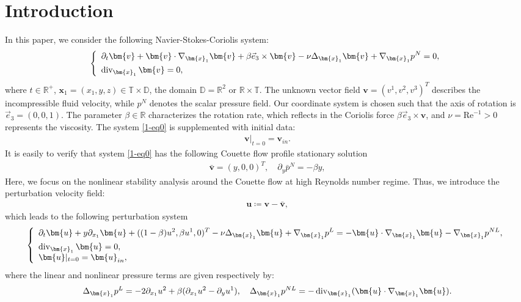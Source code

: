 \documentclass[11pt,reqno]{article}
\numberwithin{equation}{section}
\newcommand\R{{\mathbb R}}
\newcommand\T{{\mathbb T}}
\newcommand\DD{{\mathbb D}}
\newcommand\x{\bm{x}}
\newcommand\uu{\bm{u}}
\newcommand\vv{\bm{v}}
\newcommand \tri {\coloneqq}
\let\pa=\partial
\def\dive{\mathop{\rm div}\nolimits}
\newcommand{\Rey}{\mathrm{Re}}
\begin{document}
	\section{Introduction}
	
	In this paper, we consider the following Navier-Stokes-Coriolis system:
	\begin{align}\label{1-eq0}
		\left\{\begin{array}{l}
			\displaystyle
			\partial_{t}\vv + \vv\cdot \nabla_{\x_1} \vv+\beta \vec{e}_3 \times \vv-\nu \Delta_{\x_1}\vv+\nabla_{\x_1} p^N=0,
			\\[1ex]
			\displaystyle
			\dive_{\x_1} \vv=0,
		\end{array}\right.
	\end{align}
	where $t\in\R^+$, $\x_1=(x_1,y,z)\in \T\times\DD$, the domain $\DD=\R^2$ or $\R\times\T$.
	The unknown vector field $\vv=(v^1,v^2,v^3)^{T}$ describes the incompressible fluid velocity, while $p^N$ denotes the scalar pressure field.
	Our coordinate system is chosen such that the axis of rotation is  $\vec{e}_3=(0,0,1)$.
	The parameter $\beta\in\R$ characterizes the rotation rate, which reflects in the Coriolis force $\beta \vec{e}_3 \times \vv$, and $\nu=\Rey^{-1}>0$ represents the viscosity.
	The system \eqref{1-eq0} is supplemented with initial data:
	\begin{align*}
		\vv|_{t=0}=\vv_{in}.
	\end{align*}
	It is easily to verify that system \eqref{1-eq0} has the following Couette flow profile stationary solution
	\begin{align*}
		\bar{\vv}=(y,0,0)^{T},\quad \pa_{y}\bar{p}^{N}=-\beta y,
	\end{align*}
	Here, we focus on the nonlinear stability analysis around the Couette flow at high Reynolds number regime. Thus, we introduce the perturbation velocity field:
	\begin{align*}
		\uu\tri \vv-\bar{\vv},
	\end{align*}
	which leads to the following perturbation system
	\begin{align}\label{1-eq1}
		\left\{\begin{array}{l}
			\displaystyle
			\partial_{t}\uu + y\partial_{x_1}\uu+((1-\beta)u^2,\beta u^1,0)^{T}-\nu \Delta_{\x_1}\uu+\nabla_{\x_1} p^L= -\uu\cdot \nabla_{\x_1} \uu-\nabla_{\x_1} p^{NL},
			\\[1ex]
			\displaystyle
			\dive_{\x_1} \uu=0,\\
			\displaystyle \uu|_{t=0}=\uu_{in},	
		\end{array}\right.
	\end{align}
	where the linear and nonlinear pressure terms are given respectively by:
	\begin{align*}
		\Delta_{\x_1} p^L =-2\partial_{x_1} u^2 +\beta (\partial_{x_1} u^2-\partial_y u^1),\quad
		\Delta_{\x_1} p^{NL} =-\dive_{\x_1} (\uu\cdot \nabla_{\x_1} \uu).
	\end{align*}
	
\end{document}
